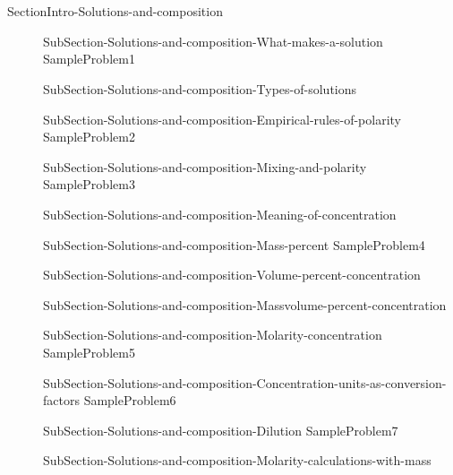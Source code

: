 \documentclass[main.tex]{subfiles} %
\begin{document}
\section{\color{blue!30!black}{Solutions and composition}}
{SectionIntro-Solutions-and-composition}
\sloppy\begin{description}
\item[]{SubSection-Solutions-and-composition-What-makes-a-solution}
{SampleProblem1}
\item[] {SubSection-Solutions-and-composition-Types-of-solutions}
 \hspace{-0cm}{Figure-Dissolution}
\item[] {SubSection-Solutions-and-composition-Empirical-rules-of-polarity}
{SampleProblem2}
\item[]{SubSection-Solutions-and-composition-Mixing-and-polarity}
 \hspace{2cm}{Table-Polarity-and-mixing}	
{SampleProblem3}
\item[]
{SubSection-Solutions-and-composition-Meaning-of-concentration}
\item[]{SubSection-Solutions-and-composition-Mass-percent}
{SampleProblem4}
\item[] {SubSection-Solutions-and-composition-Volume-percent-concentration}
\item[]{SubSection-Solutions-and-composition-Massvolume-percent-concentration}
\item[]{SubSection-Solutions-and-composition-Molarity-concentration}
{SampleProblem5}


\item[]{SubSection-Solutions-and-composition-Concentration-units-as-conversion-factors}
{SampleProblem6}
\item[]{SubSection-Solutions-and-composition-Dilution}
{SampleProblem7}
\item[]{SubSection-Solutions-and-composition-Molarity-calculations-with-mass}

\end{description}
\end{document}
